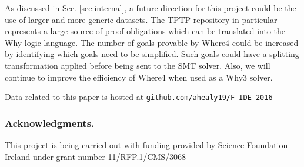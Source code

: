 \documentclass[runningheads,a4paper]{llncs}
\begin{document}
As discussed in Sec. \ref{sec:internal}, a future direction for this project could be the use of larger and more generic datasets. The TPTP repository in particular represents a large source of proof obligations which can be translated into the Why logic language. The number of goals provable by \textsf{Where4} could be increased by identifying which goals need to be simplified. Such goals could have a splitting transformation applied before being sent to the SMT solver. Also, we will continue to improve the efficiency of \textsf{Where4} when used as a \textsf{Why3} solver.  

Data related to this paper is hosted at \texttt{github.com/ahealy19/F-IDE-2016}

\subsubsection*{Acknowledgments.}This project is being carried out with funding provided by Science Foundation Ireland under grant number 11/RFP.1/CMS/3068




\end{document}
